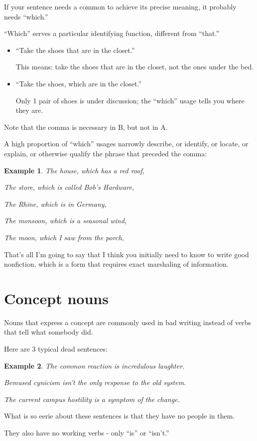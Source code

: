 \documentclass{book}
\numberwithin{equation}{section}
\newtheorem{example}{Example}[chapter]
\begin{document}
%
If your sentence needs a common to achieve its precise meaning, it probably needs ``which.''

``Which'' serves a particular identifying function, different from ``that.''
\begin{itemize}
    \item[(A)] ``Take the shoes that are in the closet.''
    
    This means: take the shoes that are in the closet, not the ones under the bed.
    \item[(B)] ``Take the shoes, which are in the closet.''
    
    Only 1 pair of shoes is under discussion; the ``which'' usage tells you where they are.
\end{itemize}
Note that the comma is necessary in B, but not in A.

A high proportion of ``which'' usages narrowly describe, or identify, or locate, or explain, or otherwise qualify the phrase that preceded the comma:
\begin{example}
    The house, which has a red roof,
    
    The store, which is called Bob's Hardware,
    
    The Rhine, which is in Germany,
    
    The monsoon, which is a seasonal wind,
    
    The moon, which I saw from the porch,
\end{example}
That's all I'm going to say that I think you initially need to know to write good nonfiction, which is a form that requires exact marshaling of information.

\section{Concept nouns}
Nouns that express a concept are commonly used in bad writing instead of verbs that tell what somebody did.

Here are 3 typical dead sentences:
\begin{example}
    The common reaction is incredulous laughter.
    
    Bemused cynicism isn't the only response to the old system.
    
    The current campus hostility is a symptom of the change.
\end{example}
What is so eerie about these sentences is that they have no people in them.

They also have no working verbs - only ``is'' or ``isn't.''
\end{document}

